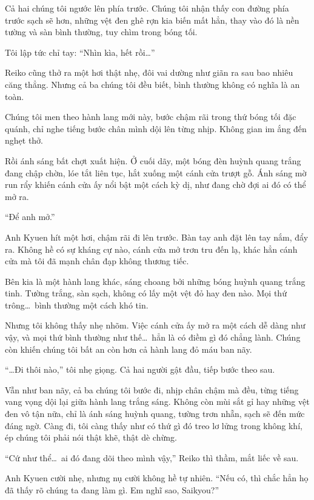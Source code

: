 \documentclass[../main.tex]{subfiles}
\begin{document}
Cả hai chúng tôi ngước lên phía trước. Chúng tôi nhận thấy con đường phía trước sạch sẽ hơn, những vệt đen ghê rợn kia biến mất hẳn, thay vào đó là nền tường và sàn bình thường, tuy chìm trong bóng tối.

Tôi lập tức chỉ tay: ``Nhìn kìa, hết rồi\dots''

Reiko cũng thở ra một hơi thật nhẹ, đôi vai dường như giãn ra sau bao nhiêu căng thẳng. Nhưng cả ba chúng tôi đều biết, bình thường không có nghĩa là an toàn.

Chúng tôi men theo hành lang mới này, bước chậm rãi trong thứ bóng tối đặc quánh, chỉ nghe tiếng bước chân mình dội lên từng nhịp. Không gian im ắng đến nghẹt thở.

Rồi ánh sáng bất chợt xuất hiện. Ở cuối dãy, một bóng đèn huỳnh quang trắng đang chập chờn, lóe tắt liên tục, hắt xuống một cánh cửa trượt gỗ. Ánh sáng mờ run rẩy khiến cánh cửa ấy nổi bật một cách kỳ dị, như đang chờ đợi ai đó có thể mở ra.

``Để anh mở.''

Anh Kyuen hít một hơi, chậm rãi đi lên trước. Bàn tay anh đặt lên tay nắm, đẩy ra. Không hề có sự kháng cự nào, cánh cửa mở trơn tru đến lạ, khác hẳn cánh cửa mà tôi đã mạnh chân đạp không thương tiếc.

Bên kia là một hành lang khác, sáng choang bởi những bóng huỳnh quang trắng tinh. Tường trắng, sàn sạch, không có lấy một vệt đỏ hay đen nào. Mọi thứ trông\dots\ bình thường một cách khó tin.

Nhưng tôi không thấy nhẹ nhõm. Việc cánh cửa ấy mở ra một cách dễ dàng như vậy, và mọi thứ bình thường như thế\dots\ hẳn là có điềm gì đó chẳng lành. Chúng còn khiến chúng tôi bất an còn hơn cả hành lang đỏ máu ban nãy.

``\dots Đi thôi nào,'' tôi nhẹ giọng. Cả hai người gật đầu, tiếp bước theo sau.

Vẫn như ban nãy, cả ba chúng tôi bước đi, nhịp chân chậm mà đều, từng tiếng vang vọng dội lại giữa hành lang trắng sáng. Không còn mùi sắt gỉ hay những vệt đen vô tận nữa, chỉ là ánh sáng huỳnh quang, tường trơn nhẵn, sạch sẽ đến mức đáng ngờ. Càng đi, tôi càng thấy như có thứ gì đó treo lơ lửng trong không khí, ép chúng tôi phải nói thật khẽ, thật dè chừng.

``Cứ như thể\dots\ ai đó đang dõi theo mình vậy,'' Reiko thì thầm, mắt liếc về sau.

Anh Kyuen cười nhẹ, nhưng nụ cười không hề tự nhiên. ``Nếu có, thì chắc hẳn họ đã thấy rõ chúng ta đang làm gì. Em nghĩ sao, Saikyou?''
\end{document}
